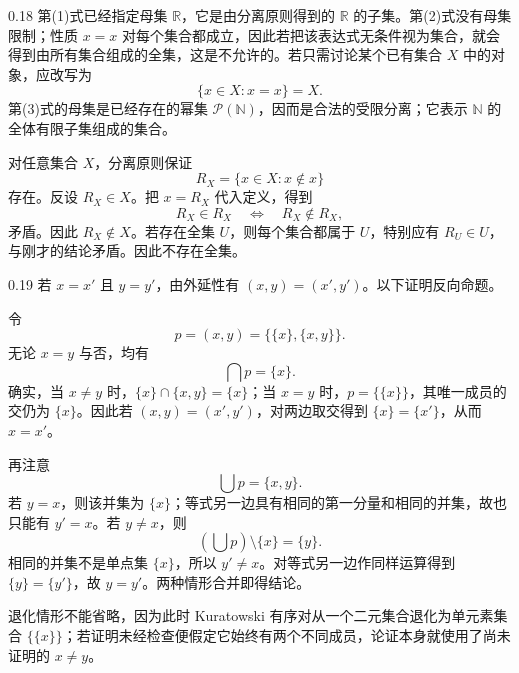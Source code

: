 \begin{solution}{0.18}
第(1)式已经指定母集 \(\mathbb R\)，它是由分离原则得到的 \(\mathbb R\) 的子集。第(2)式没有母集限制；性质 \(x=x\) 对每个集合都成立，因此若把该表达式无条件视为集合，就会得到由所有集合组成的全集，这是不允许的。若只需讨论某个已有集合 \(X\) 中的对象，应改写为
\[
  \{x\in X:x=x\}=X.
\]
第(3)式的母集是已经存在的幂集 \(\mathcal P(\mathbb N)\)，因而是合法的受限分离；它表示 \(\mathbb N\) 的全体有限子集组成的集合。

对任意集合 \(X\)，分离原则保证
\[
  R_X=\{x\in X:x\notin x\}
\]
存在。反设 \(R_X\in X\)。把 \(x=R_X\) 代入定义，得到
\[
  R_X\in R_X\quad\Longleftrightarrow\quad R_X\notin R_X,
\]
矛盾。因此 \(R_X\notin X\)。若存在全集 \(U\)，则每个集合都属于 \(U\)，特别应有 \(R_U\in U\)，与刚才的结论矛盾。因此不存在全集。
\end{solution}

\begin{solution}{0.19}
若 \(x=x'\) 且 \(y=y'\)，由外延性有 \((x,y)=(x',y')\)。以下证明反向命题。

令
\[
  p=(x,y)=\bigl\{\{x\},\{x,y\}\bigr\}.
\]
无论 \(x=y\) 与否，均有
\[
  \bigcap p=\{x\}.
\]
确实，当 \(x\ne y\) 时，\(\{x\}\cap\{x,y\}=\{x\}\)；当 \(x=y\) 时，\(p=\{\{x\}\}\)，其唯一成员的交仍为 \(\{x\}\)。因此若 \((x,y)=(x',y')\)，对两边取交得到 \(\{x\}=\{x'\}\)，从而 \(x=x'\)。

再注意
\[
  \bigcup p=\{x,y\}.
\]
若 \(y=x\)，则该并集为 \(\{x\}\)；等式另一边具有相同的第一分量和相同的并集，故也只能有 \(y'=x\)。若 \(y\ne x\)，则
\[
  \left(\bigcup p\right)\setminus\{x\}=\{y\}.
\]
相同的并集不是单点集 \(\{x\}\)，所以 \(y'\ne x\)。对等式另一边作同样运算得到 \(\{y\}=\{y'\}\)，故 \(y=y'\)。两种情形合并即得结论。

退化情形不能省略，因为此时 Kuratowski 有序对从一个二元集合退化为单元素集合 \(\{\{x\}\}\)；若证明未经检查便假定它始终有两个不同成员，论证本身就使用了尚未证明的 \(x\ne y\)。
\end{solution}

